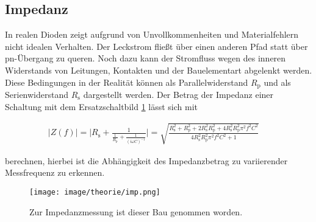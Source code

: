 
\subsection{Impedanz}

In realen Dioden zeigt aufgrund von Unvollkommenheiten und Materialfehlern nicht idealen Verhalten. Der Leckstrom fließt über einen anderen Pfad statt über pn-Übergang zu queren. Noch dazu kann der Stromfluss wegen des inneren Widerstands von Leitungen, Kontakten und der Bauelementart abgelenkt werden. Diese Bedingungen in der Realität können als Parallelwiderstand $R_\mathrm{p}$ und als Serienwiderstand $R_\mathrm{s}$ dargestellt werden.
Der Betrag der Impedanz einer Schaltung mit dem Ersatzschaltbild \ref{img:imp} lässt sich mit

\begin{align}
    \label{eq:Impedanz}
    \mid Z(f)\mid=\bigg|  R_\mathrm{s}+\frac{1}{\frac{1}{R_\mathrm{p}}+\frac{1}{(i\omega C)^{-1}}} \bigg| =\sqrt{\frac{R_\mathrm{s}^2+R_\mathrm{p}^2+2R_\mathrm{s}^2R_\mathrm{p}^2+4R_\mathrm{s}^2R_\mathrm{p}^2\pi^2f^2C^2}{4R_\mathrm{s}^2R_\mathrm{p}^2\pi^2f^2C^2+1}} \quad \,
\end{align} 

berechnen, hierbei ist die Abhängigkeit des Impedanzbetrag zu variierender Messfrequenz zu erkennen\cite{SkriptF13}.

\begin{figure}[H]
    \centering
    \texttt{[image: image/theorie/imp.png]}
    \caption[Ersatzschaltbild]{Zur Impedanzmessung ist dieser Bau genommen worden. \cite{SkriptF13}}
    \label{img:imp}
\end{figure} 
